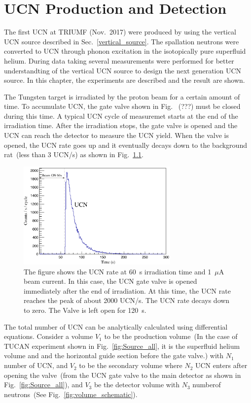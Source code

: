 \chapter{UCN Production and Detection}

The first UCN at TRIUMF (Nov.~2017) were produced by using the
vertical UCN source described in Sec.~\ref{vertical_source}. The
spallation neutrons were converted to UCN through phonon excitation in
the isotopically pure superfluid helium.  During data taking several
measurements were performed for better understandting of the vertical
UCN source to design the next generation UCN source. In this chapter,
the experiments are described and the result are shown.

The Tungsten target is irradiated by the proton beam for a certain
amount of time. To accumulate UCN, the gate valve shown in Fig.~ (???)
must be closed during this time. A typical UCN cycle of measuremet
starts at the end of the irradiation time. After the irradiation
stops, the gate valve is opened and the UCN can reach the detector to
measure the UCN yield. When the valve is opened, the UCN rate goes up
and it eventually decays down to the background rat~(less than 3
UCN/s) as shown in Fig.~\ref{fig:UCNRate}.

\begin{figure}[h]
  \centering
  \includegraphics[width=0.7\textwidth]{UCNRate.png}
  \caption{The figure shows the UCN rate at 60~s irradiation time and
    1~$\mu$A beam current. In this case, the UCN gate valve is opened
    immediately after the end of irradiation. At this time, the UCN
    rate reaches the peak of about 2000 UCN/s. The UCN rate decays
    down to zero. The Valve is left open for 120~s. }
  \label{fig:UCNRate}
\end{figure}



The total number of UCN can be analytically calculated using
differential equations.  Consider a volume $V_1$ to be the production
volume~(In the case of TUCAN experiment shown in
Fig.~\ref{fig:Source_all}, it is the superfluid helium volume and and
the horizontal guide section before the gate valve.) with $N_1$ number
of UCN, and $V_2$ to be the secondary volume where $N_2$ UCN enters
after opening the valve~(from the UCN gate valve to the main detector
as shown in Fig.~\ref{fig:Source_all}), and $V_3$ be the detector
volume with $N_3$ numberof neutrons~(See
Fig.~\ref{fig:volume_schematic}).



